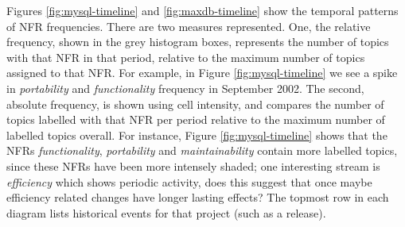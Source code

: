 \documentclass[smallextended]{svjour3}       %
\begin{document}


Figures \ref{fig:mysql-timeline} and \ref{fig:maxdb-timeline} show the
temporal patterns of NFR frequencies.
There are two measures represented. 
One, the relative frequency, shown in the grey histogram boxes, represents the number of topics with that NFR in that period, 
relative to the maximum number of topics assigned to that NFR. 
For example, in Figure \ref{fig:mysql-timeline} we see a spike in \emph{portability} and \emph{functionality} frequency in September 2002.
The second, absolute frequency, is shown using cell intensity, and compares the number of topics labelled with that NFR per period 
relative to the maximum number of labelled topics overall. 
For instance, Figure \ref{fig:mysql-timeline} shows that the NFRs
\emph{functionality}, \emph{portability} and \emph{maintainability}
contain more labelled topics, since these NFRs have been more
intensely shaded; 
one interesting stream is \emph{efficiency} which shows periodic
activity, does this suggest that once maybe efficiency related changes
have longer lasting effects?
The topmost row in each diagram lists historical events for that project (such as a release). 
\end{document}
